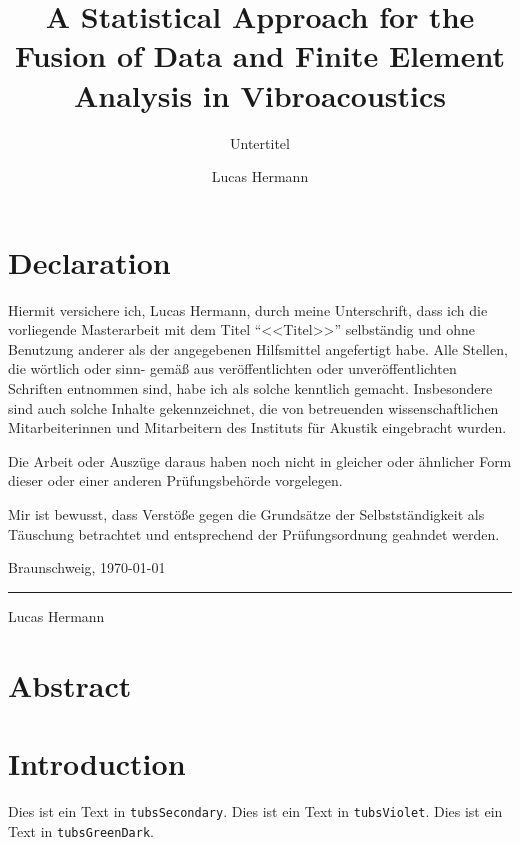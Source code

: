 \documentclass[%
  a4paper,oneside,%
  11pt,%
  smallchapters,
  green,%
  rgb, <cmyk>
  ]{tubsbook}
\title{A Statistical Approach for the Fusion of Data and
Finite Element Analysis in Vibroacoustics}
\subtitle{Untertitel}
\author{Lucas Hermann}
\begin{document}


\chapter*{Declaration}
Hiermit versichere ich, Lucas Hermann, durch meine Unterschrift, dass ich die
vorliegende Masterarbeit mit dem Titel ``<<Titel>>'' selbständig und ohne Benutzung
anderer als der angegebenen Hilfsmittel angefertigt habe. Alle Stellen, die wörtlich oder sinn-
gemäß aus veröffentlichten oder unveröffentlichten Schriften entnommen sind, habe ich als
solche kenntlich gemacht. Insbesondere sind auch solche Inhalte gekennzeichnet, die von
betreuenden wissenschaftlichen Mitarbeiterinnen und Mitarbeitern des Instituts für Akustik eingebracht wurden.

Die Arbeit oder Auszüge daraus haben noch nicht in gleicher oder ähnlicher Form dieser
oder einer anderen Prüfungsbehörde vorgelegen.

Mir ist bewusst, dass Verstöße gegen die Grundsätze der Selbstständigkeit als Täuschung
betrachtet und entsprechend der Prüfungsordnung geahndet werden.

\begin{flushright}
Braunschweig, \today
\end{flushright}

\vspace{2cm}
\hspace{2cm}\rule{5cm}{1pt}

\hspace{2cm}\small{Lucas Hermann} 

\chapter*{Abstract}
\lipsum[1]

\tableofcontents


\chapter*{Introduction}

\textcolor{tubsSecondary}{Dies ist ein Text in \texttt{tubsSecondary}.}
\textcolor{tubsViolet}{Dies ist ein Text in \texttt{tubsViolet}.}
\textcolor{tubsGreenDark}{Dies ist ein Text in \texttt{tubsGreenDark}.}\bigskip
\end{document}

